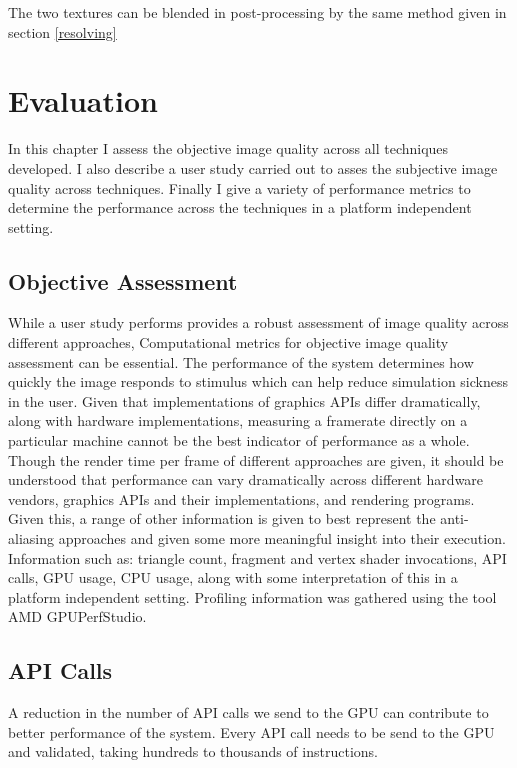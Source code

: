 \documentclass[12pt,a4paper,twoside,openright]{report}
\begin{document}
\noindent The two textures can be blended in post-processing by the same method given in section \ref{resolving}

\chapter{Evaluation}

In this chapter I assess the objective image quality across all techniques developed. I also describe a user study carried out to asses the subjective image quality across techniques. Finally I give a variety of performance metrics to determine the performance across the techniques in a platform independent setting.

\section{Objective Assessment}

While a user study performs provides a robust assessment of image quality across different approaches, Computational metrics for objective image quality assessment can be essential. The performance of the system determines how quickly the image responds to stimulus which can help reduce simulation sickness in the user. Given that implementations of graphics APIs differ dramatically, along with hardware implementations, measuring a framerate directly on a particular machine cannot be the best indicator of performance as a whole. Though the render time per frame of different approaches are given, it should be understood that performance can vary dramatically across different hardware vendors, graphics APIs and their implementations, and rendering programs. Given this, a range of other information is given to best represent the anti-aliasing approaches and given some more meaningful insight into their execution. Information such as: triangle count, fragment and vertex shader invocations, API calls, GPU usage, CPU usage, along with some interpretation of this in a platform independent setting. Profiling information was gathered using the tool AMD GPUPerfStudio.

\section{API Calls}

A reduction in the number of API calls we send to the GPU can contribute to better performance of the system. Every API call needs to be send to the GPU and validated, taking hundreds to thousands of instructions.
\end{document}
